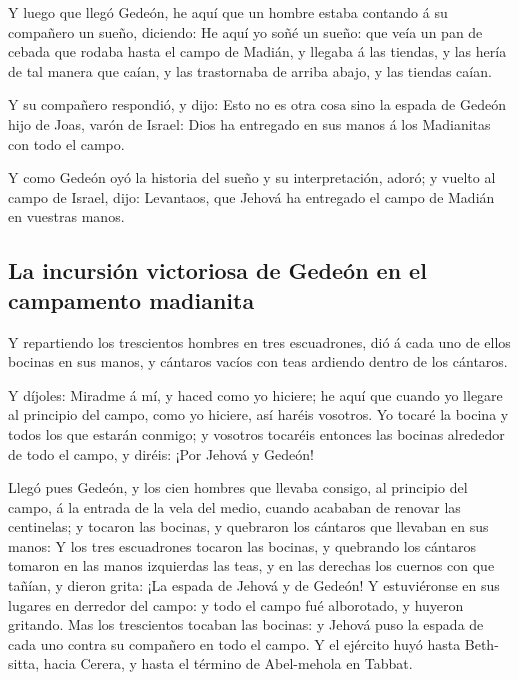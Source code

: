  Y luego que llegó Gedeón, he aquí que un hombre estaba
contando á su compañero un sueño, diciendo: He aquí yo soñé un sueño:
que veía un pan de cebada que rodaba hasta el campo de Madián, y llegaba
á las tiendas, y las hería de tal manera que caían, y las trastornaba de
arriba abajo, y las tiendas caían.

 Y su compañero respondió, y dijo: Esto no es otra cosa
sino la espada de Gedeón hijo de Joas, varón de Israel: Dios ha
entregado en sus manos á los Madianitas con todo el campo.

 Y como Gedeón oyó la historia del sueño y su
interpretación, adoró; y vuelto al campo de Israel, dijo: Levantaos, que
Jehová ha entregado el campo de Madián en vuestras manos.

\hypertarget{la-incursiuxf3n-victoriosa-de-gedeuxf3n-en-el-campamento-madianita}{%
\subsection{La incursión victoriosa de Gedeón en el campamento
madianita}\label{la-incursiuxf3n-victoriosa-de-gedeuxf3n-en-el-campamento-madianita}}

 Y repartiendo los trescientos hombres en tres escuadrones,
dió á cada uno de ellos bocinas en sus manos, y cántaros vacíos con teas
ardiendo dentro de los cántaros.

 Y díjoles: Miradme á mí, y haced como yo hiciere; he aquí
que cuando yo llegare al principio del campo, como yo hiciere, así
haréis vosotros.  Yo tocaré la bocina y todos los que
estarán conmigo; y vosotros tocaréis entonces las bocinas alrededor de
todo el campo, y diréis: ¡Por Jehová y Gedeón!

 Llegó pues Gedeón, y los cien hombres que llevaba consigo,
al principio del campo, á la entrada de la vela del medio, cuando
acababan de renovar las centinelas; y tocaron las bocinas, y quebraron
los cántaros que llevaban en sus manos:  Y los tres
escuadrones tocaron las bocinas, y quebrando los cántaros tomaron en las
manos izquierdas las teas, y en las derechas los cuernos con que tañían,
y dieron grita: ¡La espada de Jehová y de Gedeón!  Y
estuviéronse en sus lugares en derredor del campo: y todo el campo fué
alborotado, y huyeron gritando.  Mas los trescientos
tocaban las bocinas: y Jehová puso la espada de cada uno contra su
compañero en todo el campo. Y el ejército huyó hasta Beth-sitta, hacia
Cerera, y hasta el término de Abel-mehola en Tabbat.

